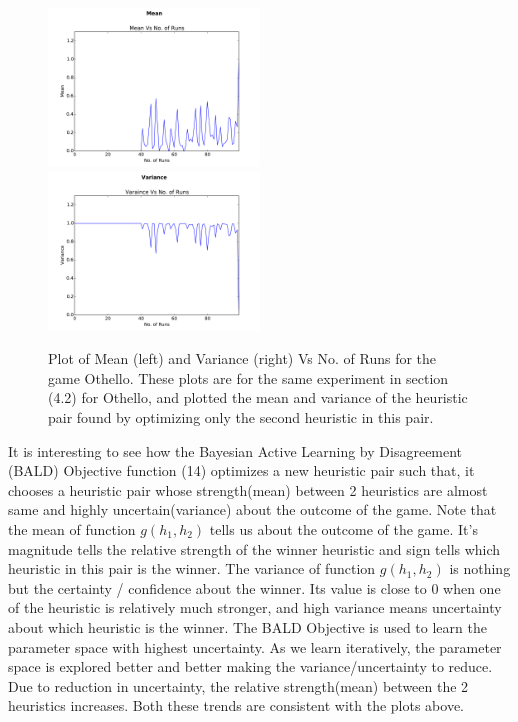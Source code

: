 \documentclass{scrartcl}
\begin{document}
{\begin{figure}[H]
      \includegraphics[width=0.5\textwidth]{othello/Mean}
\includegraphics[width=0.5\textwidth]{othello/variance}
  \caption{Plot of Mean (left) and Variance (right) Vs No. of Runs for the game Othello. These plots are for the same experiment in section (4.2) for Othello, and plotted the mean and variance of the heuristic pair found by optimizing only the second heuristic in this pair.}
\end{figure}

It is interesting to see how the Bayesian Active Learning by Disagreement (BALD) Objective function (14) optimizes a new heuristic pair such that, it chooses a heuristic pair whose strength(mean) between 2 heuristics are almost same and highly uncertain(variance) about the outcome of the game. Note that the mean of function $g(h_1,h_2)$ tells us about the outcome of the game. It's magnitude tells the relative strength of the winner heuristic and sign tells which heuristic in this pair is the winner. The variance of function $g(h_1,h_2)$ is nothing but the certainty / confidence about the winner. Its value is close to 0 when one of the heuristic is relatively much stronger, and high variance means uncertainty about which heuristic is the winner. The BALD Objective is used to learn the parameter space with highest uncertainty. As we learn iteratively, the parameter space is explored better and better making the variance/uncertainty to reduce. Due to reduction in uncertainty, the relative strength(mean) between the 2 heuristics increases. Both these trends are consistent with the plots above.



}
\end{document}
